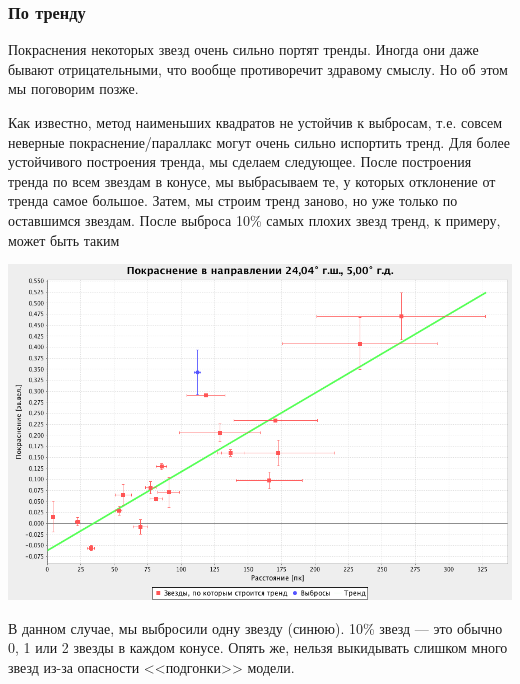 \documentclass[14pt]{article}
\begin{document}
            \subsubsection{По тренду}
                Покраснения некоторых звезд очень сильно портят тренды. Иногда они даже бывают отрицательными, что вообще противоречит здравому смыслу. Но об этом мы поговорим позже.
                
                Как известно, метод наименьших квадратов не устойчив к выбросам, т.е. совсем неверные покраснение/параллакс могут очень сильно испортить тренд. Для более устойчивого построения тренда, мы сделаем следующее. После построения тренда по всем звездам в конусе, мы выбрасываем те, у которых отклонение от тренда самое большое. Затем, мы строим тренд заново, но уже только по оставшимся звездам. После выброса 10\% самых плохих звезд тренд, к примеру, может быть таким
                \begin{center}
					\includegraphics[scale=0.3]{../../presentation/real-2.png}
				\end{center}	
                
                В данном случае, мы выбросили одну звезду (синюю). 10\% звезд --- это обычно 0, 1 или 2 звезды в каждом конусе. Опять же, нельзя выкидывать слишком много звезд из-за опасности <<подгонки>> модели. 
		  	 
		  	 
\end{document}
